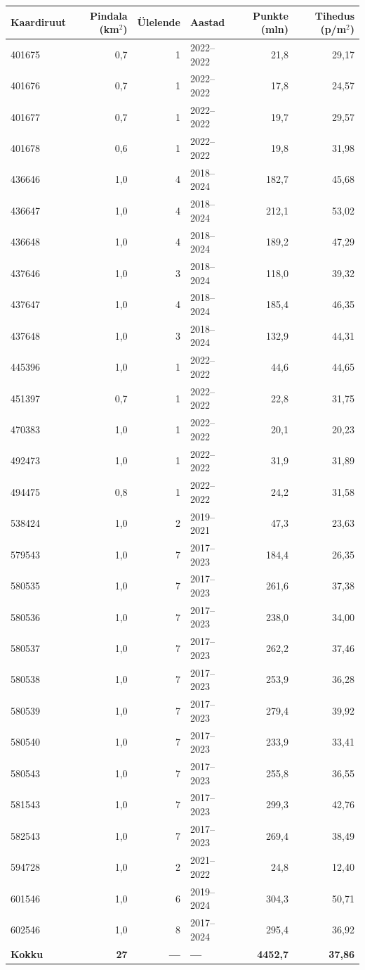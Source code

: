 \begin{center}
    \begin{tabular}{lrr l rr}
    \hline
    \textbf{Kaardiruut} & \textbf{Pindala (km$^2$)} & \textbf{Ülelende} & \textbf{Aastad} & \textbf{Punkte (mln)} & \textbf{Tihedus (p/m$^2$)} \\
    \hline
    401675 & 0,7 & 1 & 2022–2022 & 21,8 & 29,17 \\
    401676 & 0,7 & 1 & 2022–2022 & 17,8 & 24,57 \\
    401677 & 0,7 & 1 & 2022–2022 & 19,7 & 29,57 \\
    401678 & 0,6 & 1 & 2022–2022 & 19,8 & 31,98 \\
    436646 & 1,0 & 4 & 2018–2024 & 182,7 & 45,68 \\
    436647 & 1,0 & 4 & 2018–2024 & 212,1 & 53,02 \\
    436648 & 1,0 & 4 & 2018–2024 & 189,2 & 47,29 \\
    437646 & 1,0 & 3 & 2018–2024 & 118,0 & 39,32 \\
    437647 & 1,0 & 4 & 2018–2024 & 185,4 & 46,35 \\
    437648 & 1,0 & 3 & 2018–2024 & 132,9 & 44,31 \\
    445396 & 1,0 & 1 & 2022–2022 & 44,6 & 44,65 \\
    451397 & 0,7 & 1 & 2022–2022 & 22,8 & 31,75 \\
    470383 & 1,0 & 1 & 2022–2022 & 20,1 & 20,23 \\
    492473 & 1,0 & 1 & 2022–2022 & 31,9 & 31,89 \\
    494475 & 0,8 & 1 & 2022–2022 & 24,2 & 31,58 \\
    538424 & 1,0 & 2 & 2019–2021 & 47,3 & 23,63 \\
    579543 & 1,0 & 7 & 2017–2023 & 184,4 & 26,35 \\
    580535 & 1,0 & 7 & 2017–2023 & 261,6 & 37,38 \\
    580536 & 1,0 & 7 & 2017–2023 & 238,0 & 34,00 \\
    580537 & 1,0 & 7 & 2017–2023 & 262,2 & 37,46 \\
    580538 & 1,0 & 7 & 2017–2023 & 253,9 & 36,28 \\
    580539 & 1,0 & 7 & 2017–2023 & 279,4 & 39,92 \\
    580540 & 1,0 & 7 & 2017–2023 & 233,9 & 33,41 \\
    580543 & 1,0 & 7 & 2017–2023 & 255,8 & 36,55 \\
    581543 & 1,0 & 7 & 2017–2023 & 299,3 & 42,76 \\
    582543 & 1,0 & 7 & 2017–2023 & 269,4 & 38,49 \\
    594728 & 1,0 & 2 & 2021–2022 & 24,8 & 12,40 \\
    601546 & 1,0 & 6 & 2019–2024 & 304,3 & 50,71 \\
    602546 & 1,0 & 8 & 2017–2024 & 295,4 & 36,92 \\
    \hline
    \textbf{Kokku} & \textbf{27} & \textbf{—} & \textbf{—} & \textbf{4452,7} & \textbf{37,86} \\
    \hline
    \end{tabular}
\end{center}


